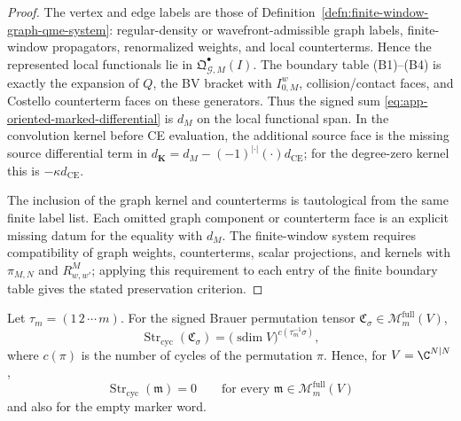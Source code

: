 \begin{proof}
  The vertex and edge labels are those of
  Definition~\ref{defn:finite-window-graph-qme-system}: regular-density
  or wavefront-admissible graph labels, finite-window propagators,
  renormalized weights, and local counterterms.  Hence the represented
  local functionals lie in
  \(\mathfrak Q^\bullet_{\mathcal G,M}(I)\).  The boundary table
  (B1)--(B4) is exactly the expansion of \(Q\), the BV bracket with
  \(I^w_{0,M}\), collision/contact faces, and Costello counterterm faces on
  these generators.  Thus the signed sum
  \eqref{eq:app-oriented-marked-differential} is \(d_M\) on the local
  functional span.  In the convolution kernel before CE evaluation, the
  additional source face is the missing source differential term in
  \(d_{\mathbf K}=d_M-(-1)^{|\cdot|}(\cdot)d_{\mathrm{CE}}\); for the
  degree-zero kernel this is \(-\kappa d_{\mathrm{CE}}\).

  The inclusion of the graph kernel and counterterms is tautological from
  the same finite label list.  Each omitted graph component or counterterm
  face is an explicit missing datum for the equality with \(d_M\).  The finite-window system requires compatibility of
  graph weights, counterterms, scalar projections, and kernels with
  \(\pi_{M,N}\) and \(R^M_{w,w'}\); applying this requirement to each entry
  of the finite boundary table gives the stated preservation criterion.
\end{proof}

\begin{lem}
\label{lem:app-full-equivariant-cyclic-supertrace}
  Let \(\tau_m=(1\,2\,\cdots\,m)\).  For the signed Brauer permutation
  tensor \(\mathfrak C_\sigma\in\mathcal M_m^{\mathrm{full}}(V)\),
  \[
    \operatorname{Str}_{\mathrm{cyc}}(\mathfrak C_\sigma)
      =
    \bigl(\operatorname{sdim}V\bigr)^{c(\tau_m^{-1}\sigma)},
    \label{eq:app-strcyc-brauer-permutation}
  \]
  where \(c(\pi)\) is the number of cycles of the permutation \(\pi\).
  Hence, for \(V=\C^{N|N}\),
  \[
    \operatorname{Str}_{\mathrm{cyc}}(\mathfrak m)=0
    \qquad
    \text{for every }
    \mathfrak m\in\mathcal M_m^{\mathrm{full}}(V)
  \]
  and also for the empty marker word.
\end{lem}

